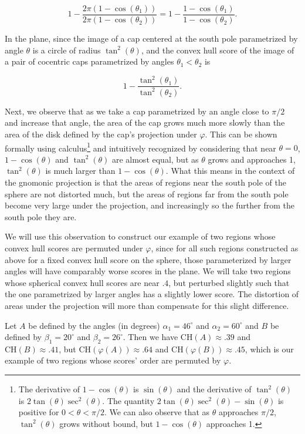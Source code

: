 {\begin{example}
  $$1-\frac{2\pi (1-\cos(\theta_1))}{2\pi (1-\cos(\theta_2))}
  = 1-\frac{1-\cos(\theta_1)}{1-\cos(\theta_2)}.$$

  In the plane, since the image of a cap centered at the south pole
  parametrized by angle $\theta$ is a circle of radius $\tan^2(\theta)$,
  and the convex hull score of the image of a pair of cocentric caps
  parametrized by angles $\theta_1<\theta_2$ is

  $$  1-\frac{\tan^2(\theta_1)}{\tan^2(\theta_2)}.  $$

  Next, we observe that as we take a cap parametrized by an angle close
  to $\pi/2$ and increase that angle, the area of the cap grows much
  more slowly than the area of the disk defined by the cap's projection
  under $\varphi$.  This can be shown formally using
  calculus\footnote{The derivative of $1-\cos(\theta)$ is $\sin(\theta)$
  and the derivative of $\tan^2(\theta)$ is
  $2\tan(\theta)\sec^2(\theta)$.  The quantity
  $2\tan(\theta)\sec^2(\theta)-\sin(\theta)$ is positive for
  $0<\theta<\pi/2$.  We can also observe that as $\theta$ approaches
  $\pi/2$, $\tan^2(\theta)$ grows without bound, but $1-\cos(\theta)$
  approaches 1.} and intuitively recognized by considering that near
  $\theta=0$, $1-\cos(\theta)$ and $\tan^2(\theta)$ are almost equal,
  but as $\theta$ grows and approaches 1, $\tan^2(\theta)$ is much
  larger than $1-\cos(\theta)$.  What this means in the context of the
  gnomonic projection is that the areas of regions near the south pole
  of the sphere are not distorted much, but the areas of regions far
  from the south pole become very large under the projection, and
  increasingly so the further from the south pole they are. 

  We will use this observation to construct our example of two regions
  whose convex hull scores are permuted under $\varphi$, since for all
  such regions constructed as above for a fixed convex hull score on the
  sphere, those parameterized by larger angles will have comparably
  worse scores in the plane.  We will take two regions whose spherical
  convex hull scores are near $.4$, but perturbed slightly such that the
  one parametrized by larger angles has a slightly lower score.  The
  distortion of areas under the projection will more than compensate for
  this slight difference.


  Let $A$ be defined by the angles (in degrees) $\alpha_1=46^\circ$ and
  $\alpha_2=60^\circ$ and $B$ be defined by $\beta_1=20^\circ$ and
  $\beta_2=26^\circ$.  Then we have $\mathrm{CH}(A)\approx .39$ and
  $\mathrm{CH}(B)\approx .41$, but $\mathrm{CH}(\varphi(A))\approx .64$
  and $\mathrm{CH}(\varphi(B))\approx .45$, which is our example of two
  regions whose scores' order are permuted by $\varphi$.
\end{example}
}
